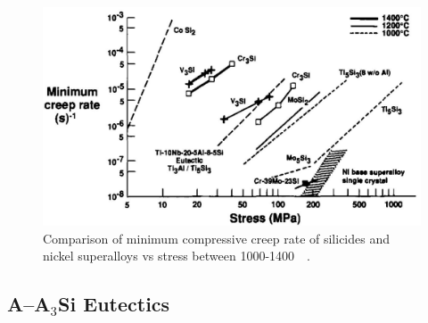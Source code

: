 \vspace{-.5cm}
%
\begin{figure}[H]
\begin{center}
\includegraphics[width=.9\textwidth]{creepshah92_2}
\caption{Comparison of minimum compressive creep rate of silicides and nickel superalloys vs stress between 1000-1400\celsius\ ~\cite{shah92}.}\label{fig:creepshah92_2}
\end{center}
\end{figure}
%
\subsection{A--A$_3$Si Eutectics}

